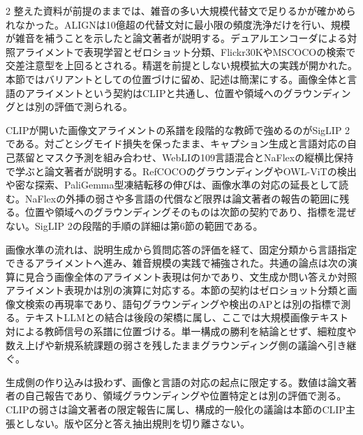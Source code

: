 \documentclass[lualatex,a4paper,10pt]{jlreq}
\begin{document}
\begin{multicols}{2}
\noindent 整えた資料が前提のままでは、雑音の多い大規模代替文で足りるかが確かめられなかった。ALIGNは10億超の代替文対に最小限の頻度洗浄だけを行い、規模が雑音を補うことを示したと論文著者が説明する。デュアルエンコーダによる対照アライメントで表現学習とゼロショット分類、Flickr30KやMSCOCOの検索で交差注意型を上回るとされる。精選を前提としない規模拡大の実践が開かれた。本節ではバリアントとしての位置づけに留め、記述は簡潔にする。画像全体と言語のアライメントという契約はCLIPと共通し、位置や領域へのグラウンディングとは別の評価で測られる。\autocite{vmd040}\par\medskip
\noindent CLIPが開いた画像文アライメントの系譜を段階的な教師で強めるのがSigLIP 2である。対ごとシグモイド損失を保ったまま、キャプション生成と言語対応の自己蒸留とマスク予測を組み合わせ、WebLIの109言語混合とNaFlexの縦横比保持で学ぶと論文著者が説明する。RefCOCOのグラウンディングやOWL-ViTの検出や密な探索、PaliGemma型凍結転移の伸びは、画像水準の対応の延長として読む。NaFlexの外挿の弱さや多言語の代償など限界は論文著者の報告の範囲に残る。位置や領域へのグラウンディングそのものは次節の契約であり、指標を混ぜない。SigLIP 2の段階的手順の詳細は第6節の範囲である。\autocite{vmd039,vmd114}\par\medskip
\noindent 画像水準の流れは、説明生成から質問応答の評価を経て、固定分類から言語指定できるアライメントへ進み、雑音規模の実践で補強された。共通の論点は次の演算に見合う画像全体のアライメント表現は何かであり、文生成か問い答えか対照アライメント表現かは別の演算に対応する。本節の契約はゼロショット分類と画像文検索の再現率であり、語句グラウンディングや検出のAPとは別の指標で測る。テキストLLMとの結合は後段の架橋に属し、ここでは大規模画像テキスト対による教師信号の系譜に位置づける。単一構成の勝利を結論とせず、細粒度や数え上げや新規系統課題の弱さを残したままグラウンディング側の議論へ引き継ぐ。\autocite{vmd037,vmd038,vmd039,vmd040}\par\medskip
\end{multicols}
\begin{claimboundary}[本節の読解上の境界]
\noindent 生成側の作り込みは扱わず、画像と言語の対応の起点に限定する。数値は論文著者の自己報告であり、領域グラウンディングや位置特定とは別の評価で測る。CLIPの弱さは論文著者の限定報告に属し、構成的一般化の議論は本節のCLIP主張としない。版や区分と答え抽出規則を切り離さない。\autocite{vmd039,vmd037,vmd038,vmd040}\par
\end{claimboundary}

\Needspace{0.20\textheight}
\end{document}
